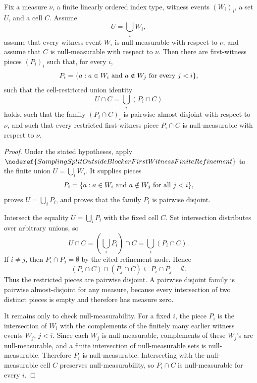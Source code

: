 \begin{helper}
Fix a measure \(\nu\), a finite linearly ordered index type, witness events
\((W_i)_i\), a set \(U\), and a cell \(C\).  Assume
\[
  U=\bigcup_i W_i,
\]
assume that every witness event \(W_i\) is null-measurable with respect to
\(\nu\), and assume that \(C\) is null-measurable with respect to \(\nu\).
Then there are first-witness pieces \((P_i)_i\) such that, for every \(i\),
\[
  P_i=\{a:a\in W_i\hbox{ and }a\notin W_j\hbox{ for every }j<i\},
\]
such that the cell-restricted union identity
\[
  U\cap C=\bigcup_i(P_i\cap C)
\]
holds, such that the family \((P_i\cap C)_i\) is pairwise almost-disjoint
with respect to \(\nu\), and such that every restricted first-witness piece
\(P_i\cap C\) is null-measurable with respect to \(\nu\).
\end{helper}
\begin{proof}
Under the stated hypotheses, apply
\(\noderef{SamplingSplitOutsideBlockerFirstWitnessFiniteRefinement}\) to the
finite union \(U=\bigcup_i W_i\).  It supplies pieces
\[
  P_i=\{a:a\in W_i\hbox{ and }a\notin W_j\hbox{ for all }j<i\},
\]
proves \(U=\bigcup_iP_i\), and proves that the family \(P_i\) is pairwise
disjoint.

Intersect the equality \(U=\bigcup_iP_i\) with the fixed cell \(C\).  Set
intersection distributes over arbitrary unions, so
\[
  U\cap C=(\bigcup_iP_i)\cap C=\bigcup_i(P_i\cap C).
\]
If \(i\ne j\), then \(P_i\cap P_j=\emptyset\) by the cited refinement node.
Hence
\[
  (P_i\cap C)\cap(P_j\cap C)\subseteq P_i\cap P_j=\emptyset.
\]
Thus the restricted pieces are pairwise disjoint.  A pairwise disjoint
family is pairwise almost-disjoint for any measure, because every
intersection of two distinct pieces is empty and therefore has measure zero.

It remains only to check null-measurability.  For a fixed \(i\), the piece
\(P_i\) is the intersection of \(W_i\) with the complements of the finitely
many earlier witness events \(W_j\), \(j<i\).  Since each \(W_j\) is
null-measurable, complements of these \(W_j\)'s are null-measurable, and a
finite intersection of null-measurable sets is null-measurable.  Therefore
\(P_i\) is null-measurable.  Intersecting with the null-measurable cell
\(C\) preserves null-measurability, so \(P_i\cap C\) is null-measurable for
every \(i\).
\end{proof}
